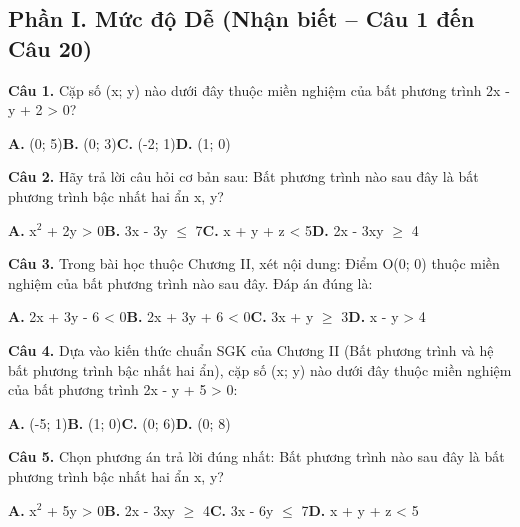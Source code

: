 \documentclass[11pt,a4paper]{article}
\begin{document}
\subsection*{\color{accent} Phần I. Mức độ Dễ (Nhận biết -- Câu 1 đến Câu 20)}
\textbf{\color{primary} Câu 1.} Cặp số (x; y) nào dưới đây thuộc miền nghiệm của bất phương trình 2x - y + 2 > 0?\par
\hspace*{1.5em}\textbf{A.} (0; 5)\quad\quad \textbf{B.} (0; 3)\quad\quad \textbf{C.} (-2; 1)\quad\quad \textbf{D.} (1; 0)\par\vspace{2pt}
\textbf{\color{primary} Câu 2.} Hãy trả lời câu hỏi cơ bản sau: Bất phương trình nào sau đây là bất phương trình bậc nhất hai ẩn x, y?\par
\hspace*{1.5em}\textbf{A.} x$^2$ + 2y > 0\quad\quad \textbf{B.} 3x - 3y $\le$ 7\quad\quad \textbf{C.} x + y + z < 5\quad\quad \textbf{D.} 2x - 3xy $\ge$ 4\par\vspace{2pt}
\textbf{\color{primary} Câu 3.} Trong bài học thuộc Chương II, xét nội dung: Điểm O(0; 0) thuộc miền nghiệm của bất phương trình nào sau đây. Đáp án đúng là:\par
\hspace*{1.5em}\textbf{A.} 2x + 3y - 6 < 0\quad\quad \textbf{B.} 2x + 3y + 6 < 0\quad\quad \textbf{C.} 3x + y $\ge$ 3\quad\quad \textbf{D.} x - y > 4\par\vspace{2pt}
\textbf{\color{primary} Câu 4.} Dựa vào kiến thức chuẩn SGK của Chương II (Bất phương trình và hệ bất phương trình bậc nhất hai ẩn), cặp số (x; y) nào dưới đây thuộc miền nghiệm của bất phương trình 2x - y + 5 > 0:\par
\hspace*{1.5em}\textbf{A.} (-5; 1)\quad\quad \textbf{B.} (1; 0)\quad\quad \textbf{C.} (0; 6)\quad\quad \textbf{D.} (0; 8)\par\vspace{2pt}
\textbf{\color{primary} Câu 5.} Chọn phương án trả lời đúng nhất: Bất phương trình nào sau đây là bất phương trình bậc nhất hai ẩn x, y?\par
\hspace*{1.5em}\textbf{A.} x$^2$ + 5y > 0\quad\quad \textbf{B.} 2x - 3xy $\ge$ 4\quad\quad \textbf{C.} 3x - 6y $\le$ 7\quad\quad \textbf{D.} x + y + z < 5\par\vspace{2pt}
\end{document}
